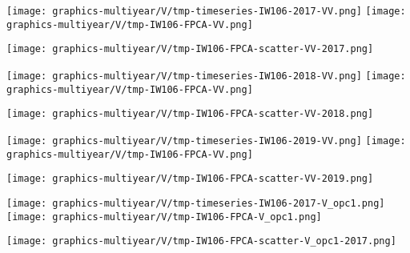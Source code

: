 
\begin{center}
\begin{minipage}{7.0in}
\texttt{[image: graphics-multiyear/V/tmp-timeseries-IW106-2017-VV.png]}
\quad
\texttt{[image: graphics-multiyear/V/tmp-IW106-FPCA-VV.png]}
\vskip 1.0cm
\begin{center}
\texttt{[image: graphics-multiyear/V/tmp-IW106-FPCA-scatter-VV-2017.png]}
\end{center}
\end{minipage}
\end{center}


\begin{center}
\begin{minipage}{7.0in}
\texttt{[image: graphics-multiyear/V/tmp-timeseries-IW106-2018-VV.png]}
\quad
\texttt{[image: graphics-multiyear/V/tmp-IW106-FPCA-VV.png]}
\vskip 1.0cm
\begin{center}
\texttt{[image: graphics-multiyear/V/tmp-IW106-FPCA-scatter-VV-2018.png]}
\end{center}
\end{minipage}
\end{center}


\begin{center}
\begin{minipage}{7.0in}
\texttt{[image: graphics-multiyear/V/tmp-timeseries-IW106-2019-VV.png]}
\quad
\texttt{[image: graphics-multiyear/V/tmp-IW106-FPCA-VV.png]}
\vskip 1.0cm
\begin{center}
\texttt{[image: graphics-multiyear/V/tmp-IW106-FPCA-scatter-VV-2019.png]}
\end{center}
\end{minipage}
\end{center}


\begin{center}
\begin{minipage}{7.0in}
\texttt{[image: graphics-multiyear/V/tmp-timeseries-IW106-2017-V\_opc1.png]}
\quad
\texttt{[image: graphics-multiyear/V/tmp-IW106-FPCA-V\_opc1.png]}
\vskip 1.0cm
\begin{center}
\texttt{[image: graphics-multiyear/V/tmp-IW106-FPCA-scatter-V\_opc1-2017.png]}
\end{center}
\end{minipage}
\end{center}

